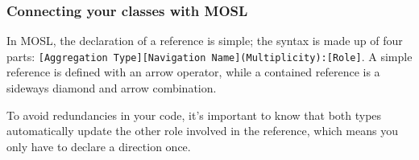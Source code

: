 \newpage
\subsubsection{Connecting your classes with MOSL}
\texHeader
\hypertarget{static:references tex}{}

In MOSL, the declaration of a reference is simple; the syntax is made up of four parts:  \small{\texttt{[Aggregation Type][Navigation
Name](Multiplicity):[Role]}}. A simple reference is defined with an arrow operator, while a contained reference is a sideways diamond and arrow combination.

To avoid redundancies in your code, it's important to know that both types automatically update the other role involved in the reference, which means you only
have to declare a direction once.


